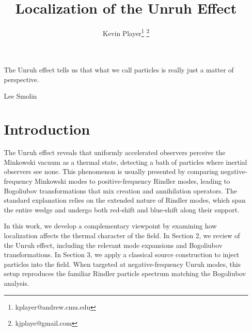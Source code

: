\documentclass[12pt,a4paper]{article}
\begin{document}
\title{Localization of the Unruh Effect}
\author[1]{Kevin Player\footnote{kplayer@andrew.cmu.edu} \footnote{kjplaye@gmail.com}}

\maketitle

\epigraph{The Unruh effect tells us that what we call particles is really just a matter of perspective.}{Lee Smolin}



\section{Introduction}

The Unruh effect\cite{unruh1976notes} reveals that uniformly accelerated observers perceive the Minkowski vacuum as a thermal state, detecting a bath of particles where inertial observers see none. This phenomenon is usually presented by comparing negative-frequency Minkowski modes to positive-frequency Rindler modes, leading to Bogoliubov transformations that mix creation and annihilation operators\cite{crispino2008unruh}. The standard explanation relies on the extended nature of Rindler modes, which span the entire wedge and undergo both red-shift and blue-shift along their support.

In this work, we develop a complementary viewpoint by examining how localization affects the thermal character of the field. In Section 2, we review of the Unruh effect, including the relevant mode expansions and Bogoliubov transformations. In Section 3, we apply a classical source construction \cite{Schwinger_1966} to inject particles into the field. When targeted at negative-frequency Unruh modes, this setup reproduces the familiar Rindler particle spectrum matching the Bogoliubov analysis.
\end{document}
